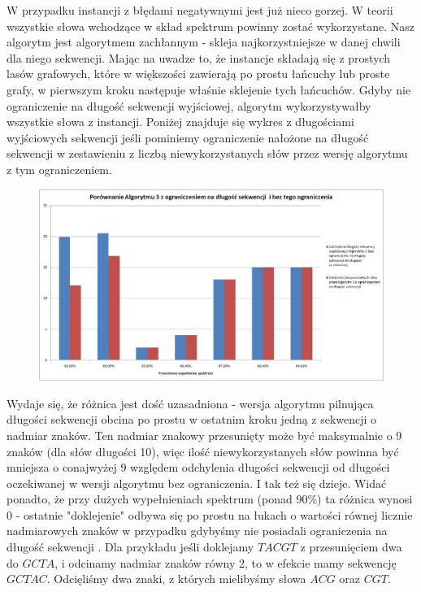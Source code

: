 \documentclass[a4paper,10pt]{article}
\begin{document}
W przypadku instancji z błędami negatywnymi jest już nieco gorzej. W teorii wszystkie słowa wchodzące w skład spektrum powinny zostać wykorzystane. Nasz algorytm jest algorytmem zachłannym - skleja najkorzystniejsze w danej chwili dla niego sekwencji. Mając na uwadze to, że instancje składają się z prostych lasów grafowych, które w większości zawierają po prostu łańcuchy lub proste grafy, w pierwszym kroku następuje właśnie sklejenie tych łańcuchów. Gdyby nie ograniczenie na długość sekwencji wyjściowej, algorytm wykorzystywałby wszystkie słowa z instancji. Poniżej znajduje się wykres z długościami wyjściowych sekwencji jeśli pominiemy ograniczenie nałożone na długość sekwencji w zestawieniu z liczbą niewykorzystanych słów przez wersję algorytmu z tym ograniczeniem.

\begin{figure}[h]
  \footnotesize\centering
  \includegraphics[width=\textwidth,keepaspectratio]{withoutNConstraint_general_negative.png}
\end{figure}

Wydaje się, że różnica jest dość uzasadniona - wersja algorytmu pilnująca długości sekwencji obcina po prostu w ostatnim kroku jedną z sekwencji o nadmiar znaków. Ten nadmiar znakowy przesunięty może być maksymalnie o 9 znaków (dla słów długości 10), więc ilość niewykorzystanych słów powinna być mniejsza o conajwyżej 9 względem odchylenia długości sekwencji od długości oczekiwanej w wersji algorytmu bez ograniczenia. I tak też się dzieje. Widać ponadto, że przy dużych wypełnieniach spektrum (ponad 90\%) ta różnica wynosi 0 - ostatnie "doklejenie" odbywa się po prostu na łukach o wartości równej licznie nadmiarowych znaków w przypadku gdybyśmy nie posiadali ograniczenia na długość sekwencji . Dla przykładu jeśli doklejamy $TACGT$ z przesunięciem dwa do $GCTA$, i odcinamy nadmiar znaków równy 2, to w efekcie mamy sekwencję $GCTAC$. Odcięliśmy dwa znaki, z których mielibyśmy słowa $ACG$ oraz $CGT$.
\end{document}
